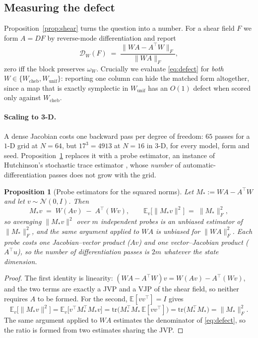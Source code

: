 \documentclass[11pt]{article}
\newtheorem{proposition}[theorem]{Proposition}
\theoremstyle{definition}
\theoremstyle{remark}
\newcommand{\defect}{\mathcal{D}}
\newcommand{\Wc}{W_{\mathrm{cheb}}}
\newcommand{\Wu}{W_{\mathrm{unif}}}
\begin{document}
\subsection{Measuring the defect}
\label{sec:defect}

Proposition~\ref{prop:shear} turns the question into a number. For a shear field
$F$ we form $A=DF$ by reverse-mode differentiation and report
\begin{equation}
\defect_W(F) \;=\; \frac{\lVert WA-A^{\top}W\rVert_F}{\lVert WA\rVert_F},
\label{eq:defect}
\end{equation}
zero iff the block preserves $\omega_W$. Crucially we evaluate
\eqref{eq:defect} for \emph{both} $W\in\{\Wc,\Wu\}$: reporting one column can hide the
matched form altogether, since a map that is exactly symplectic in $\Wu$ has an
$O(1)$ defect when scored only against $\Wc$.

\paragraph{Scaling to 3-D.} A dense Jacobian costs one backward pass per degree
of freedom: $65$ passes for a $1$-D grid at $N=64$, but $17^3=4913$ at $N=16$
in $3$-D, for every model, form and seed.
Proposition~\ref{prop:hutch} replaces it with a probe estimator, an instance of
Hutchinson's stochastic trace estimator
\citep{hutchinson1990trace,avron2011trace}, whose \emph{number} of
automatic-differentiation passes does not grow with the grid.

\begin{proposition}[Probe estimators for the squared norms]
\label{prop:hutch}
Let $M_\ast := WA-A^{\top}W$ and let $v\sim\mathcal{N}(0,I)$. Then
\begin{equation}
M_\ast v \;=\; W(Av)\;-\;A^{\top}(Wv),
\qquad
\mathbb{E}_v\big[\lVert M_\ast v\rVert^2\big] \;=\; \lVert M_\ast\rVert_F^2 ,
\label{eq:hutch}
\end{equation}
so averaging $\lVert M_\ast v\rVert^2$ over $m$ independent probes is an unbiased
estimator of $\lVert M_\ast\rVert_F^2$, and the same argument applied to $WA$ is
unbiased for $\lVert WA\rVert_F^2$. Each probe costs one Jacobian--vector product
($Av$) and one vector--Jacobian product ($A^{\top}u$), so the \emph{number} of
differentiation passes is $2m$ whatever the state dimension.
\end{proposition}

\begin{proof}
The first identity is linearity: $(WA-A^{\top}W)v=W(Av)-A^{\top}(Wv)$, and the two
terms are exactly a JVP and a VJP of the shear field, so neither requires $A$ to
be formed. For the second, $\mathbb{E}[vv^{\top}]=I$ gives
\[
\mathbb{E}_v\big[\lVert M_\ast v\rVert^2\big]
= \mathbb{E}_v\big[v^{\top}M_\ast^{\top}M_\ast v\big]
= \mathrm{tr}\big(M_\ast^{\top}M_\ast\,\mathbb{E}[vv^{\top}]\big)
= \mathrm{tr}\big(M_\ast^{\top}M_\ast\big)
= \lVert M_\ast\rVert_F^2 .
\]
The same argument applied to $WA$ estimates the denominator of
\eqref{eq:defect}, so the ratio is formed from two estimates sharing the JVP.
\end{proof}
\end{document}
